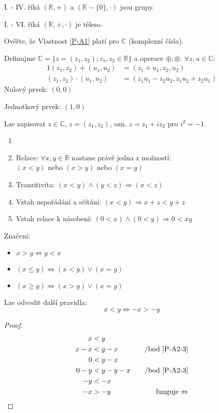 I. - IV. říká $(\mathbb{R}, +)$ a $(\mathbb{R} - \{0\}, \cdot)$ jsou grupy.

I. - VI. říká $(\mathbb{R}, +, \cdot)$ je těleso.

Ověřte, že Vlastnost \ref{P-A1} platí pro $\mathbb{C}$ (komplexní čísla).

\begin{example}
	Definujme $\mathbb{C} = \{z = (z_1, z_2); z_1, z_2 \in \mathbb{R}\}$ a
	operace $\oplus, \otimes$. $\forall z, u \in \mathbb{C}:$
	\begin{alignat}{1}
		(z_1, z_2) + (u_1, u_2) &= (z_1 + u_1, z_2, u_2) \\
		(z_1, z_2) \cdot (u_1, u_2) &= (z_1u_1 - z_2u_2, z_1u_2 + z_2u_1)
	\end{alignat}
	Nulový prvek: $(0, 0)$
	
	Jednotkový prvek: $(1, 0)$

	Lze zapisovat $z\in \mathbb{C}$, $z = (z_1, z_2)$, ozn. $z = z_1 + iz_2$ pro $i^2 = -1$.
\end{example}
\begin{property}[Uspořádání]\label{P-A2}
	\begin{enumerate}[I]
		\item[]
		\item Relace: $\forall x, y \in \mathbb{R}$ nastane právě jedna z možností: \\
		$(x<y)$ nebo $(x>y)$ nebo $(x=y)$
		\item Tranzitivita: $(x<y) \land (y<z) \Rightarrow (x<z)$
		\item\label{P-A2-3} Vztah uspořádání a sčítání: $(x<y) \Rightarrow x+z < y+z$
		\item\label{P-A2-4} Vztah relace k násobení: $(0<x) \land (0<y) \Rightarrow 0 < xy$
	\end{enumerate}
\end{property}

Značení:
\begin{itemize}
	\item $x>y \Leftrightarrow y<x$
	\item $(x\leq y) \Leftrightarrow (x<y) \lor (x=y)$
	\item $(x\geq y) \Leftrightarrow (x>y) \lor (x=y)$
\end{itemize}

Lze odvodit další pravidla:
\begin{equation}\label{RelationsOfNegatives}
	x<y \Leftrightarrow -x > -y
\end{equation}
\begin{proof}
	\begin{alignat*}{2}
		x&<y \\
		x-x&<y-x &\text{\quad /bod \ref{P-A2-3}} \\
		0&<y-x \\
		0-y&<y-y-x &\text{\quad /bod \ref{P-A2-3}} \\
		-y&<-x \\
		-x&>-y &\text{\quad funguje $\Leftrightarrow$} \\
	\end{alignat*}
\end{proof}

